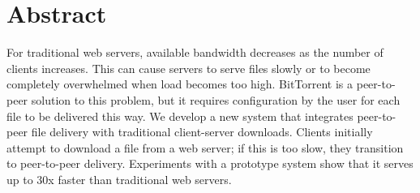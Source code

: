 \section {Abstract}
For traditional web servers, available bandwidth decreases as the number of clients increases.  
This can cause servers to serve files slowly or to become completely overwhelmed when load becomes too high.
BitTorrent is a peer-to-peer solution to this problem, but it requires configuration by the user for each
file to be delivered this way.
We develop a new system that integrates peer-to-peer file delivery with traditional client-server downloads.  
Clients initially attempt to download a file from a web server; if this is too slow, they transition to peer-to-peer
delivery.  Experiments with a prototype system show that it serves up to 30x faster than traditional web servers.